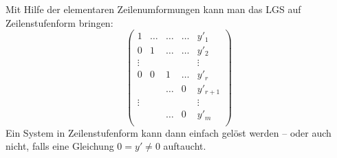	\begin{Definition}[Zeilenstufenform]
	Mit Hilfe der elementaren Zeilenumformungen kann man das LGS auf Zeilenstufenform bringen:
		\[ \begin{pmatrix}
			1 & \dots & \dots &\dots & y'_1\\
			0 & 1 & \dots &\dots & y'_2\\
			\vdots & & & &\vdots \\
			0 & 0 & 1 &\dots & y'_r\\
			  &   & \dots  &   0 & y'_{r+1}\\
			\vdots & & & & \vdots \\
			  &   &  \dots &   0 & y'_{m}\\
		\end{pmatrix} \]
	Ein System in Zeilenstufenform kann dann einfach gelöst werden -- oder auch nicht, falls eine Gleichung $ 0 = y' \neq 0 $ auftaucht.
	\end{Definition}
